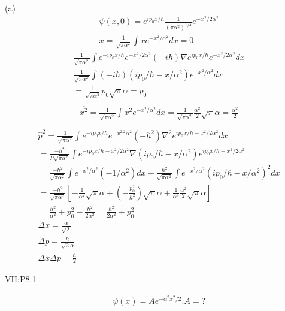 \documentclass{article}
\begin{document}
  (a)\begin{align*}
    &\psi(x,0)=e^{ip_0x/\hbar}\frac1{(\pi\alpha^2)^{1/4}}e^{-x^2/2\alpha^2}\\
    &\overline{x}=\frac1{\sqrt{\pi\alpha^2}}\int xe^{-x^2/\alpha^2}dx=0
  \end{align*}
  \begin{align*}
    & \frac1{\sqrt{\pi\alpha^2}}\int e^{-ip_0x/\hbar}e^{-x^2/2\alpha^2}( -i\hbar )\nabla e^{ip_0x/\hbar}e^{-x^2/2\alpha^2}dx\\
    &\frac1{\sqrt{\pi\alpha^2}}\int (-i\hbar)(ip_0/\hbar-x/\alpha^2)e^{-x^2/\alpha^2}dx \\
    & =\frac1{\sqrt{\pi\alpha^2}}p_0 \sqrt{\pi}\alpha=p_0 \\
  \end{align*}
  \begin{align*}
    & \overline{x^2}=\frac1{\sqrt{\pi\alpha^2}}\int x^2 e^{-x^2/\alpha^2}dx=\frac1{\sqrt{\pi\alpha^2}}\frac{\alpha^2}2\sqrt{\pi}\alpha=\frac{\alpha^2}2 \\
  \end{align*}
  \begin{align*}
  & \overline{\hat p^2}=\frac1{\sqrt{\pi\alpha^2}}\int e^{-ip_0x/\hbar}e^{-x^2.2\alpha^2}(-\hbar^2)\nabla^2e^{ip_0x/\hbar-x^2/2\alpha^2}dx\\
  &=\frac{-\hbar^2}{P\sqrt{\pi\alpha^2}}\int e^{-ip_0x/\hbar-x^2/2\alpha^2}\nabla(ip_0/\hbar-x/\alpha^2)e^{ip_0x/\hbar-x^2/2\alpha^2}  \\
  &=\frac{-\hbar^2}{\sqrt{\pi\alpha^2}}\int e^{-x^2/\alpha^2}(-1/\alpha^2)dx-\frac{\hbar^2}{\sqrt{\pi\alpha^2}}\int e^{-x^2/\alpha^2}(ip_0/\hbar-x/\alpha^2)^2dx \\
  &=\frac{-\hbar^2}{\sqrt{\pi\alpha^2}}[-\frac1{\alpha^2}\sqrt{\pi}\alpha+(-\frac{p_0^2}{\hbar^2})\sqrt{\pi}\alpha+\frac1{\alpha^4}\frac{\alpha^2}2\sqrt{\pi}\alpha]  \\
  & =\frac{\hbar^2}{\alpha^2}+p_0^2-\frac{\hbar^2}{2\alpha^2}=\frac{\hbar^2}{2\alpha^2}+p_0^2\\
  &\Delta x=\frac{\alpha}{\sqrt{2}}\\
  &\Delta p=\frac{\hbar}{\sqrt{2}\alpha} \\
  & \Delta x\Delta p=\frac{\hbar}2
  \end{align*}

  VII:P8.1 

  \begin{align*}
&\psi(x)=Ae^{-\alpha^2x^2/2}.A=?\\
  \end{align*}
\end{document}

